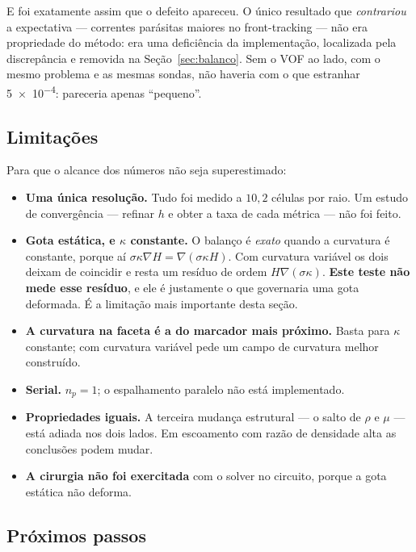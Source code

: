 E foi exatamente assim que o defeito apareceu. O \'unico resultado que
\emph{contrariou} a expectativa --- correntes par\'asitas maiores no
front-tracking --- n\~ao era propriedade do m\'etodo: era uma deficiência da
implementa\c{c}\~ao, localizada pela discrep\^ancia e removida na
Se\c{c}\~ao~\ref{sec:balanco}. Sem o VOF ao lado, com o mesmo problema e as
mesmas sondas, n\~ao haveria com o que estranhar \num{5e-4}: pareceria apenas
``pequeno''.

\subsection{Limita\c{c}\~oes}

Para que o alcance dos n\'umeros n\~ao seja superestimado:

\begin{itemize}
  \item \textbf{Uma \'unica resolu\c{c}\~ao.} Tudo foi medido a $10{,}2$
    c\'elulas por raio. Um estudo de converg\^encia --- refinar $h$ e obter a
    taxa de cada m\'etrica --- n\~ao foi feito.
  \item \textbf{Gota est\'atica, e $\kappa$ constante.} O balan\c{c}o \'e
    \emph{exato} quando a curvatura \'e constante, porque a\'i
    $\sigma\kappa\nabla H = \nabla(\sigma\kappa H)$. Com curvatura vari\'avel os
    dois deixam de coincidir e resta um res\'iduo de ordem $H\nabla(\sigma\kappa)$.
    \textbf{Este teste n\~ao mede esse res\'iduo}, e ele \'e justamente o que
    governaria uma gota deformada. \'E a limita\c{c}\~ao mais importante desta
    se\c{c}\~ao.
  \item \textbf{A curvatura na faceta \'e a do marcador mais pr\'oximo.} Basta
    para $\kappa$ constante; com curvatura vari\'avel pede um campo de curvatura
    melhor construído.
  \item \textbf{Serial.} $n_p=1$; o espalhamento paralelo n\~ao est\'a
    implementado.
  \item \textbf{Propriedades iguais.} A terceira mudan\c{c}a estrutural --- o
    salto de $\rho$ e $\mu$ --- est\'a adiada nos dois lados. Em escoamento com
    raz\~ao de densidade alta as conclus\~oes podem mudar.
  \item \textbf{A cirurgia n\~ao foi exercitada} com o solver no circuito, porque
    a gota est\'atica n\~ao deforma.
\end{itemize}

\subsection{Pr\'oximos passos}

